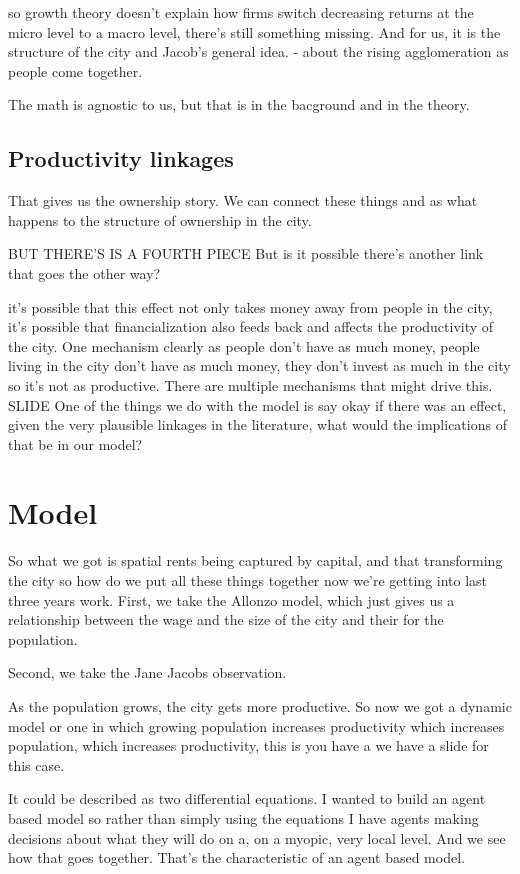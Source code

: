so growth theory doesn't explain how firms switch decreasing returns at the micro level to a macro level, there's still something missing. 
And for us, it is the structure of the city and Jacob's general idea. - about the rising agglomeration as people come together. 


The math is agnostic to us, but that is in the bacground and in the theory. 


\subsection{Productivity linkages}

That gives us the ownership story. We can connect these things and as what happens to the structure of ownership in the city. 

BUT THERE'S IS A FOURTH PIECE
But is it possible there's another link that goes the other way?

it's  possible that this effect not only takes money away from people in the city, it's possible that financialization also feeds back and  affects the productivity of the city. One mechanism clearly as people don't have as much money, people living in the city don't have as much money, they don't invest as much in the city so it's not as productive. 
There are multiple mechanisms that might drive this. SLIDE
One of the things we do with the model is say okay if there was an effect, given the very plausible linkages in the literature, what would the implications of that be in our model?

\section{Model}


So what we got is spatial rents being captured by capital, and that transforming the city so how do we put all these things together now we're getting into last three years work.
First, we take the Allonzo model, which just gives us a relationship between the wage and the size of the city and their for the population.

Second, we take the Jane Jacobs observation.

As the population grows, the city gets more productive. So now we got a dynamic model or one in which growing population increases productivity which increases population, which increases productivity, this is you have a we have a slide for this case.

It could be described as two differential equations. I wanted to build an agent based model so rather than simply using the equations I have agents making decisions about what they will do on a, on a myopic, very local level. And we see how that goes together. That's the characteristic of an agent based model.

